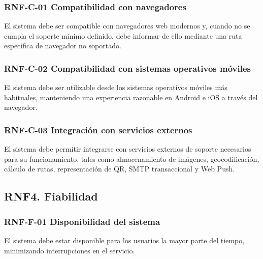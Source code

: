 \vspace{-0.75em}
\subsubsection{RNF-C-01 Compatibilidad con navegadores}
\vspace{-1em}

El sistema debe ser compatible con navegadores web modernos y, cuando no se cumpla el soporte mínimo definido, debe informar de ello mediante una ruta específica de navegador no soportado.

\vspace{-0.75em}
\subsubsection{RNF-C-02 Compatibilidad con sistemas operativos móviles}
\vspace{-1em}

El sistema debe ser utilizable desde los sistemas operativos móviles más habituales, manteniendo una experiencia razonable en Android e iOS a través del navegador.

\vspace{-0.75em}
\subsubsection{RNF-C-03 Integración con servicios externos}
\vspace{-1em}

El sistema debe permitir integrarse con servicios externos de soporte necesarios para su funcionamiento, tales como almacenamiento de imágenes, geocodificación, cálculo de rutas, representación de QR, SMTP transaccional y Web Push.

\subsection{RNF4. Fiabilidad}

\vspace{-0.75em}
\subsubsection{RNF-F-01 Disponibilidad del sistema}
\vspace{-1em}

El sistema debe estar disponible para los usuarios la mayor parte del tiempo, minimizando interrupciones en el servicio.

